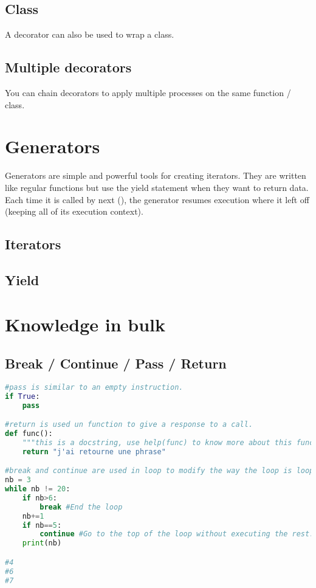 \documentclass[a4paper, 12pt]{article}
\begin{document}
\subsection{Class}
A decorator can also be used to wrap a class.

\subsection{Multiple decorators}
You can chain decorators to apply multiple processes on the same function / class.

\newpage
\section{Generators}
\label{sec:Generators}
Generators are simple and powerful tools for creating iterators. They are written like regular functions but use the yield statement when they want to return data. Each time it is called by next (), the generator resumes execution where it left off (keeping all of its execution context).\newline
\subsection{Iterators}
\subsection{Yield}

\newpage
\section{Knowledge in bulk}
\subsection{Break / Continue / Pass / Return}
\label{subsec:BCPR}
\begin{lstlisting}[language=Python]
#pass is similar to an empty instruction.
if True:
    pass

#return is used un function to give a response to a call.
def func():
	"""this is a docstring, use help(func) to know more about this function."""
	return "j'ai retourne une phrase"

#break and continue are used in loop to modify the way the loop is looping.
nb = 3
while nb != 20:
	if nb>6:
		break #End the loop
	nb+=1
	if nb==5:
		continue #Go to the top of the loop without executing the rest.	
	print(nb)

#4
#6
#7
\end{lstlisting}
\end{document}
